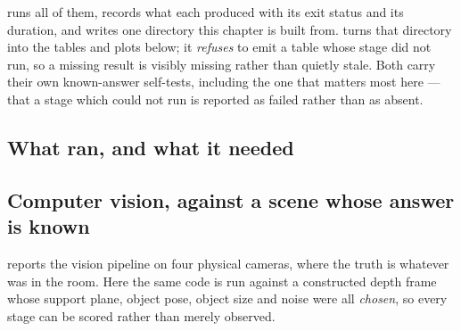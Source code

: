  runs all of them, records what
each produced with its exit status and its duration, and writes one directory
this chapter is built from.  turns that
directory into the tables and plots below; it \emph{refuses} to emit a table
whose stage did not run, so a missing result is visibly missing rather than
quietly stale. Both carry their own known-answer self-tests, including the
one that matters most here --- that a stage which could not run is reported
as failed rather than as absent.

\subsection{What ran, and what it needed}

\begin{table}[htbp]
  \centering
  \small
  \caption[The simulation campaign]{Every stage of the campaign. Two tiers,
  and the distinction is load-bearing. \emph{Standalone} stages are
  arithmetic, kinematics and analysis in one process --- no middleware, no
  motion planner, no cameras --- and are the ones a reader can reproduce on a
  laptop. \emph{Simulated platform} stages need a live ,
  so a MoveIt stack is brought up for them; one stack serves all of them at
  once, because two planning clients against one scene has already produced a
  measurement in which one run's furniture was in the other run's scene.
  \emph{Recorded data} is neither: it is analysis of data captured from
  physical hardware, tagged separately so its numbers are never read as
  simulation output.}
  \label{tab:campaign}
  
\end{table}

\subsection{Computer vision, against a scene whose answer is known}
\label{sec:sim-cv}

 reports the vision pipeline on four physical cameras, where
the truth is whatever was in the room. Here the same code is run against a
constructed depth frame whose support plane, object pose, object size and
noise were all \emph{chosen}, so every stage can be scored rather than merely
observed.

\begin{table}[htbp]
  \centering
  \small
  \caption[The vision pipeline against a constructed scene]{Twenty-one
  known-answer checks on a constructed frame: a plane at a chosen offset,
  a \SI{40}{\milli\metre} cube turned to a chosen yaw, and
  \SI{0.3}{\milli\metre} of noise. The rows marked \emph{control} are the
  half that makes this a measurement rather than a demonstration --- each is
  a naive method that must get the answer \emph{wrong}, and a change that
  broke the pipeline into agreeing with them would fail here.}
  \label{tab:sim-cv}
  
\end{table}

